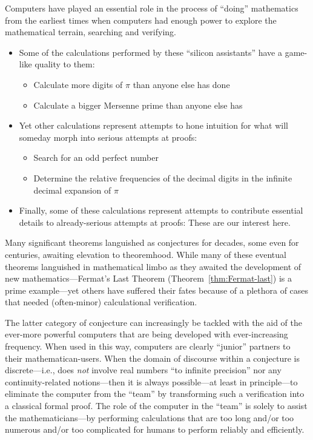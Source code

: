 Computers have played an essential role in the process of ``doing'' mathematics from the earliest times when computers had enough power to explore the mathematical terrain, searching and verifying.
\begin{itemize}
\item
Some of the calculations performed by these ``silicon assistants'' have a game-like quality to them:
  \begin{itemize}
  \item
Calculate more digits of $\pi$ than anyone else has done
  \medskip\item
Calculate a bigger Mersenne prime than anyone else has
  \end{itemize}

\medskip\item
Yet other calculations represent attempts to hone intuition for what will someday morph into serious attempts at proofs:
  \begin{itemize}
  \item
Search for an odd perfect number
  \medskip\item
Determine the relative frequencies of the decimal digits in the infinite decimal expansion of $\pi$
  \end{itemize}

\medskip\item
Finally, some of these calculations represent attempts to contribute essential details to already-serious attempts at proofs: These are our interest here.
\end{itemize}

Many significant theorems languished as conjectures for decades, some even for centuries, awaiting elevation to theoremhood.  While many of these eventual theorems languished in mathematical limbo as they awaited the development of new mathematics---Fermat's Last Theorem (Theorem~\ref{thm:Fermat-last}) is a prime example---yet others have suffered their fates because of a plethora of cases that needed (often-minor) calculational verification.

The latter category of conjecture can increasingly be tackled with the aid of the ever-more powerful computers that are being developed with ever-increasing frequency.  When used in this way, computers are clearly ``junior'' partners to their mathematican-users.  When the domain of discourse within a conjecture is discrete---i.e., does {\em not} involve real numbers ``to infinite precision'' nor any continuity-related notions---then it is always possible---at least in principle---to eliminate the computer from the ``team'' by transforming such a verification into a classical formal proof.  The role of the computer in the ``team'' is solely to assist the mathematicians---by
performing calculations that are too long and/or too numerous and/or too complicated for humans to perform reliably and efficiently.

